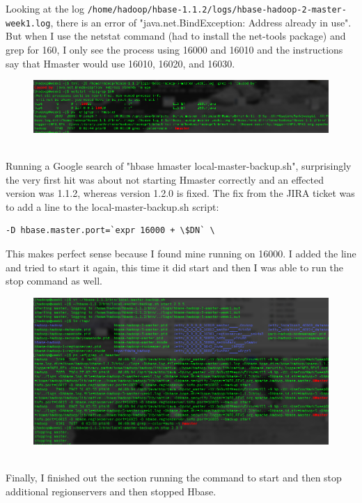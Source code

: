\documentclass[10pt]{article}
\begin{document}
\indent Looking at the log \verb|/home/hadoop/hbase-1.1.2/logs/hbase-hadoop-2-master-week1.log|, there is an error of "java.net.BindException: Address already in use". But when I use the netstat command (had to install the net-tools package) and grep for 160, I only see the process using 16000 and 16010 and the instructions say that Hmaster would use 16010, 16020, and 16030.
\begin{figure}[!h]
\includegraphics[scale=0.37]{address_inuse.png}
\centering
\end{figure}\\
\indent Running a Google search of "hbase hmaster local-master-backup.sh", surprisingly the very first hit was about not starting Hmaster correctly and an effected version was 1.1.2, whereas version 1.2.0 is fixed. The fix from the JIRA ticket was to add a line to the local-master-backup.sh script: 
\begin{verbatim}
-D hbase.master.port=`expr 16000 + \$DN` \
\end{verbatim}
This makes perfect sense because I found mine running on 16000. I added the line and tried to start it again, this time it did start and then I was able to run the stop command as well.
\begin{figure}[!h]
\includegraphics[scale=0.37]{hmasterClust_start.png}
\centering
\end{figure}\\
\indent Finally, I finished out the section running the command to start and then stop additional regionservers and then stopped Hbase.
\pagebreak
\end{document}
